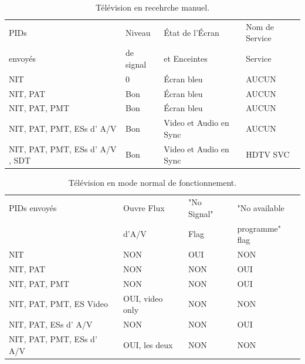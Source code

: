 \documentclass[12pt,a4paper]{article}
\begin{document}
\begin{table}
    \caption {Télévision en recehrche manuel.}
    \begin{center}
\begin{tabular}{|l|l|l|l|}
    \hline
     PIDs                    & Niveau  & État de l'Écran & Nom de Service \\
	  envoyés                   & de signal & et Enceintes & Service \\ \hline
    NIT                         & 0            & Écran bleu              & AUCUN         \\ \hline
    NIT, PAT                    & Bon         & Écran bleu              & AUCUN         \\ \hline
    NIT, PAT, PMT               & Bon         & Écran bleu              & AUCUN         \\ \hline
    NIT, PAT, PMT, ESs d' A/V       & Bon         & Video et Audio en Sync  & AUCUN         \\ \hline
    NIT, PAT, PMT, ESs d' A/V , SDT & Bon         & Video et Audio en Sync  & HDTV SVC \\ \hline
    \end{tabular}
	\label{tab_manual_tuning}
\end{center}
\end{table}

\begin{table}
    \caption {Télévision en mode normal de fonctionnement.}
    \begin{center}
\begin{tabular}{|l|l|l|l|}
    \hline
    PIDs envoyés               & Ouvre Flux & "No Signal" & "No available \\
                   & d'A/V & Flag & programme" flag \\ \hline
    NIT                     & NON                & OUI              & NON                            \\ \hline
    NIT, PAT                & NON               & NON               & OUI                           \\ \hline
    NIT, PAT, PMT           & NON                & NON               & OUI                           \\ \hline
    NIT, PAT, PMT,  ES Video& OUI, video only   & NON               & NON                            \\ \hline
    NIT, PAT, ESs d' A/V   & NON         & NON               & OUI                            \\ \hline
	NIT, PAT, PMT, ESs d' A/V  & OUI, les deux         & NON              & NON                            \\ \hline
    \end{tabular}
	\label{tab_normal_operation}
\end{center}
\end{table}
\end{document}
